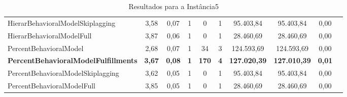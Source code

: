 \begin{table}[H]
{\begin{tabular}{lccccccccc}
            HierarBehavioralModelSkiplagging & 3,58 & 0,07 & 1 & 0   & 1 & 95.403,84  & 95.403,84  & 0,00 \\
            HierarBehavioralModelFull & 3,87 & 0,06 & 1 & 0   & 1 & 28.460,69 & 28.460,69 & 0,00 \\
            PercentBehavioralModel & 2,68 & 0,07 & 1 & 34  & 3 & 124.593,69 & 124.593,69 & 0,00 \\
            \textbf{PercentBehavioralModelFulfillments} & \textbf{3,67} & \textbf{0,08} & \textbf{1} & \textbf{170} & \textbf{4} & \textbf{127.020,39} & \textbf{127.010,39} & \textbf{0,01} \\
            PercentBehavioralModelSkiplagging & 3,62 & 0,05 & 1 & 0   & 1 & 95.403,84  & 95.403,84  & 0,00 \\
            PercentBehavioralModelFull & 3,85 & 0,05 & 1 & 0   & 1 & 28.460,69 & 28.460,69 & 0,00 \\ \hline
        \end{tabular}%
    }
    \caption{Resultados para a Instância5}
    \label{tab:resultado_instancia5}
\end{table}


